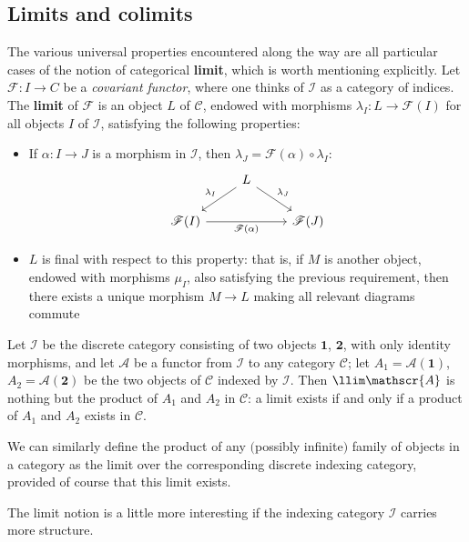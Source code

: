 \subsection{Limits and colimits}
The various universal properties encountered along the way are all particular cases of the notion of categorical \textbf{limit}, which is worth mentioning explicitly. Let $\mathscr{F}:I\to C$ be a \textit{covariant functor}, where one thinks of $\mathcal{I}$ as a category of indices. The \textbf{limit} of $\mathscr{F}$ is an object $L$ of $\mathcal{C}$, endowed with morphisms $\lambda_I:L\to\mathscr{F}(I)$ for all objects $I$ of $\mathcal{I}$, satisfying the
following properties:
\begin{itemize}
\item If $\alpha:I\to J$ is a morphism in $\mathcal{I}$, then $\lambda_J=\mathscr{F}(\alpha)\circ\lambda_I$:
\[\begin{tikzcd}
&L\ar[ld,swap,"\lambda_I"]\ar[rd,"\lambda_J"]&\\
\mathscr{F}(I)\ar[rr,swap,"\mathscr{F}(\alpha)"]&&\mathscr{F}(J)
\end{tikzcd}\]
\item $L$ is final with respect to this property: that is, if $M$ is another object, endowed with morphisms $\mu_I$, also satisfying the previous requirement, then there exists a unique morphism $M\to L$ making all relevant diagrams commute
\end{itemize}
\begin{example}
Let $\mathcal{I}$ be the discrete category consisting of two objects $\bm{1}$, $\bm{2}$, with only identity morphisms, and let $\mathscr{A}$ be a functor from $\mathcal{I}$ to any category $\mathcal{C}$; let $A_1=\mathscr{A}(\bm{1})$, $A_2=\mathscr{A}(\bm{2})$ be the two objects of $\mathcal{C}$ indexed by $\mathcal{I}$. Then $\llim\mathscr{A}$ is nothing but the product of $A_1$ and $A_2$ in $\mathcal{C}$: a limit exists if and only if a product of $A_1$ and $A_2$ exists in $\mathcal{C}$.\par 
We can similarly define the product of any $($possibly infinite$)$ family of objects in a category as the limit over the corresponding discrete indexing category, provided of course that this limit exists.
\end{example}
The limit notion is a little more interesting if the indexing category $\mathcal{I}$ carries more structure.
